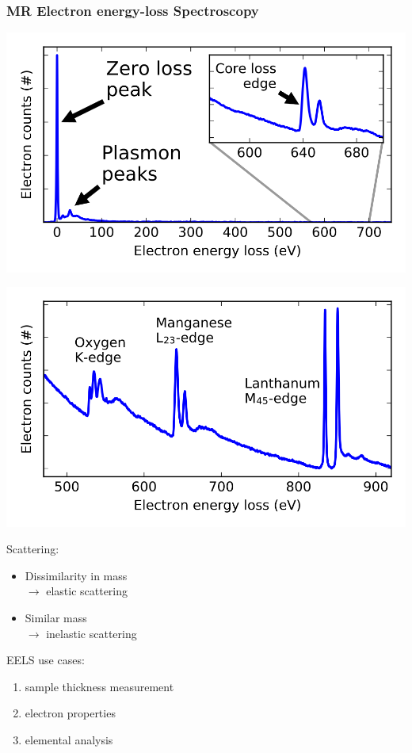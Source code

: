 \documentclass{beamer}
\begin{document}
\begin{frame}
	\frametitle{MR \textbf{Electron energy-loss Spectroscopy}}
	\begin{minipage}{0.5\linewidth}
		\begin{minipage}{1\linewidth}
			\includegraphics[width=1\linewidth, keepaspectratio]{Figures/big_eels.png}%
		\end{minipage}%
		\hfill
		\begin{minipage}{1\linewidth}
			\includegraphics[width=1\linewidth, keepaspectratio]{Figures/eels-edge.png}
		\end{minipage}
		\vfill
	\end{minipage}%
	\hspace*{0.1\linewidth}
	\begin{minipage}{0.45\linewidth}
		Scattering:
		\begin{itemize}
			\item Dissimilarity in mass\\ $\rightarrow$ elastic scattering
			   \item Similar mass\\ $\rightarrow$ inelastic scattering
		\end{itemize}
		EELS use cases:
		\begin{enumerate}
			\item sample thickness measurement
   			\item electron properties
      		\item elemental analysis
		\end{enumerate}\\
	\end{minipage}
\end{frame}
\end{document}
